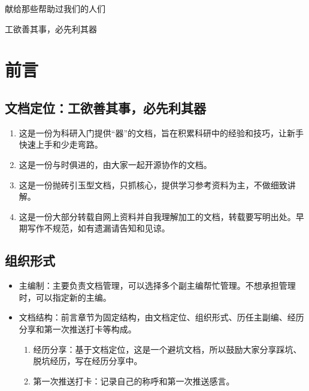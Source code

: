 \documentclass[cn,11pt,chinese,twoside]{elegantbook}
\begin{document}
\maketitle
\frontmatter


\newpage
\thispagestyle{empty}
\noindent\begin{center}
{\fontsize{20pt}{0}\kaishu 献给那些帮助过我们的人们}
\end{center} 

\newpage
\thispagestyle{empty}
\noindent\begin{center}
{\fontsize{20pt}{0}\kaishu 工欲善其事，必先利其器} %
\end{center} 


\tableofcontents
\label{content}
\mainmatter


\chapter*{前言}
\section*{文档定位：工欲善其事，必先利其器}
\begin{enumerate}
\item 这是一份为科研入门提供“器”的文档，旨在积累科研中的经验和技巧，让新手快速上手和少走弯路。
\item 这是一份与时俱进的，由大家一起开源协作的文档。
\item 这是一份抛砖引玉型文档，只抓核心，提供学习参考资料为主，不做细致讲解。
\item 这是一份大部分转载自网上资料并自我理解加工的文档，转载要写明出处。早期写作不规范，如有遗漏请告知和见谅。
\end{enumerate}



\section*{组织形式}
\begin{itemize}
\item 主编制：主要负责文档管理，可以选择多个副主编帮忙管理。不想承担管理时，可以指定新的主编。
\item 文档结构：前言章节为固定结构，由文档定位、组织形式、历任主副编、经历分享和第一次推送打卡等构成。
\begin{enumerate}
\item 经历分享：基于文档定位，这是一个避坑文档，所以鼓励大家分享踩坑、脱坑经历，写在经历分享中。
\item 第一次推送打卡：记录自己的称呼和第一次推送感言。
\end{enumerate}
\end{itemize}
\end{document}
